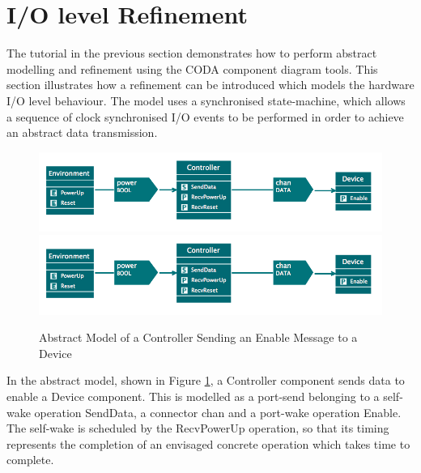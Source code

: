 \section{I/O level Refinement}
\label{sec:component_diagrams-ioLevel}

The tutorial in the previous section demonstrates how to perform abstract modelling and refinement using the CODA component diagram tools. This section illustrates how a refinement can be introduced which models the hardware I/O level behaviour. The model uses a synchronised state-machine, which allows a sequence of clock synchronised I/O events to be performed in order to achieve an abstract data transmission.

 \begin{figure}[!htbp]
  \centering
  \ifplastex
  \includegraphics[width=1024]{figures/image53.png}
  \else
  \includegraphics[width=1\textwidth]{figures/image53.png}
  \fi
  \caption{Abstract Model of a Controller Sending an Enable Message to a Device}
  \label{fig:AbstractModelOfAControllerSendingAnEnableMessageToADevice}
\end{figure} 

In the abstract model, shown in Figure \ref{fig:AbstractModelOfAControllerSendingAnEnableMessageToADevice}, a Controller component sends data to enable a Device component. This is modelled as a port-send belonging to a self-wake operation SendData, a connector chan and a port-wake operation Enable. The self-wake is scheduled by the RecvPowerUp operation, so that its timing represents the completion of an envisaged concrete operation which takes time to complete.

